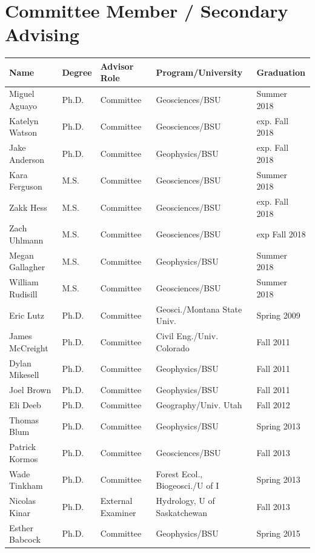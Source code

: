 \documentclass[11pt]{article}
\renewcommand\arraystretch{1}
\begin{document}
\section*{Committee Member / Secondary Advising}
\begin{table}[!htbp]
\renewcommand\arraystretch{0.7}
  \centering
  \begin{tabular}{|l|l|l|l|l|}
\hline
\textbf{Name} & \textbf{Degree} & \textbf{Advisor Role} & \textbf{Program/University} & \textbf{Graduation} \\ \hline \hline
Miguel Aguayo & Ph.D. & Committee & Geosciences/BSU & Summer 2018 \\ \hline
Katelyn Watson & Ph.D. & Committee & Geosciences/BSU & exp. Fall 2018 \\ \hline
Jake Anderson & Ph.D. & Committee & Geophysics/BSU & exp. Fall 2018 \\ \hline
Kara Ferguson & M.S. & Committee & Geosciences/BSU & Summer 2018 \\ \hline
Zakk Hess & M.S. & Committee & Geosciences/BSU & exp. Fall 2018 \\ \hline
Zach Uhlmann & M.S. & Committee & Geosciences/BSU & exp Fall 2018 \\ \hline
Megan Gallagher & M.S. & Committee & Geophysics/BSU & Summer 2018 \\ \hline
William Rudisill & M.S. & Committee & Geosciences/BSU & Summer 2018 \\ \hline
Eric Lutz & Ph.D. & Committee & Geosci./Montana State Univ. & Spring 2009 \\ \hline
James McCreight & Ph.D. & Committee & Civil Eng./Univ. Colorado & Fall 2011 \\ \hline
Dylan Mikesell & Ph.D. & Committee & Geophysics/BSU & Fall 2011 \\ \hline
Joel Brown & Ph.D. & Committee & Geophysics/BSU & Fall 2011 \\ \hline
Eli Deeb & Ph.D. & Committee & Geography/Univ. Utah & Fall 2012 \\ \hline
Thomas Blum & Ph.D. & Committee & Geophysics/BSU & Spring 2013 \\ \hline
Patrick Kormos & Ph.D. & Committee & Geosciences/BSU & Fall 2013 \\ \hline
Wade Tinkham & Ph.D. & Committee & Forest Ecol., Biogeosci./U of I  & Spring 2013 \\ \hline
Nicolas Kinar & Ph.D. & External Examiner & Hydrology, U of Saskatchewan & Fall 2013 \\ \hline
Esther Babcock & Ph.D. & Committee & Geophysics/BSU & Spring 2015 \\ \hline

\end{tabular}
\end{table}
\end{document}
